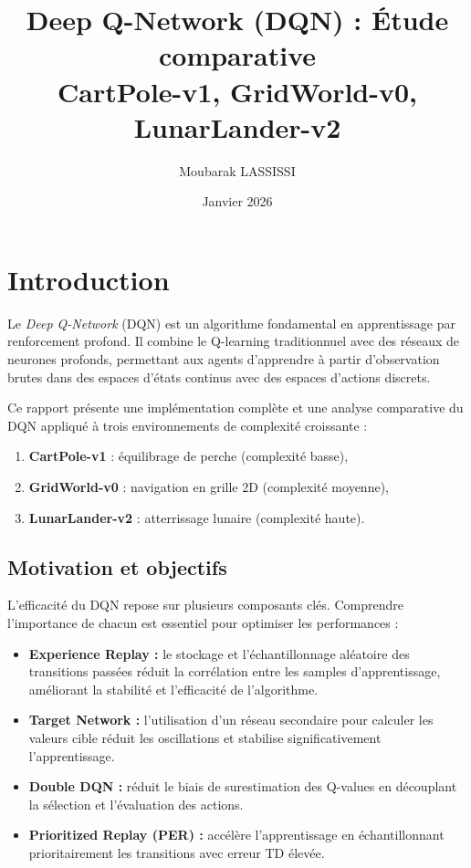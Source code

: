 \documentclass[12pt,a4paper]{article}
\title{\textbf{Deep Q-Network (DQN) : Étude comparative  \\ CartPole-v1, GridWorld-v0, LunarLander-v2}}
\author{Moubarak LASSISSI}
\date{Janvier 2026}
\begin{document}
\maketitle
\tableofcontents
\newpage

\section{Introduction}

Le \textit{Deep Q-Network} (DQN) est un algorithme fondamental en apprentissage par renforcement profond. Il combine le Q-learning traditionnuel avec des réseaux de neurones profonds, permettant aux agents d'apprendre à partir d'observation brutes dans des espaces d'états continus avec des espaces d'actions discrets.

Ce rapport présente une implémentation complète et une analyse comparative du DQN appliqué à trois environnements de complexité croissante :
\begin{enumerate}
    \item \textbf{CartPole-v1} : équilibrage de perche (complexité basse),
    \item \textbf{GridWorld-v0} : navigation en grille 2D (complexité moyenne),
    \item \textbf{LunarLander-v2} : atterrissage lunaire (complexité haute).
\end{enumerate}

\subsection{Motivation et objectifs}

L'efficacité du DQN repose sur plusieurs composants clés. Comprendre l'importance de chacun est essentiel pour optimiser les performances :

\begin{itemize}
    \item \textbf{Experience Replay :} le stockage et l'échantillonnage aléatoire des transitions passées réduit la corrélation entre les samples d'apprentissage, améliorant la stabilité et l'efficacité de l'algorithme.

    \item \textbf{Target Network :} l'utilisation d'un réseau secondaire pour calculer les valeurs cible réduit les oscillations et stabilise significativement l'apprentissage.

    \item \textbf{Double DQN :} réduit le biais de surestimation des Q-values en découplant la sélection et l'évaluation des actions.

    \item \textbf{Prioritized Replay (PER) :} accélère l'apprentissage en échantillonnant prioritairement les transitions avec erreur TD élevée.
\end{itemize}
\end{document}
